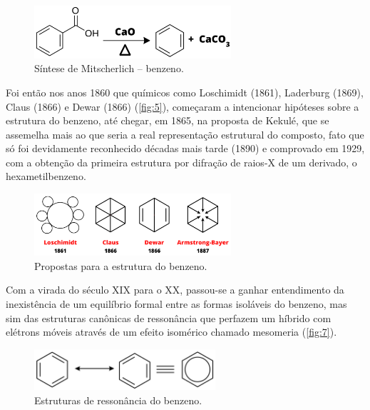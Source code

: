 \begin{figure}[htb]
	\caption{Síntese de Mitscherlich – benzeno.}
    \label{fig:4a}
	\begin{center}
		\includegraphics[width=0.65\textwidth]{images/fig2(2).png}
	\end{center}
\end{figure}

Foi então nos anos 1860 que químicos como Loschimidt (1861), Laderburg (1869), Claus (1866) e Dewar (1866) (\autoref{fig:5}), começaram a intencionar hipóteses sobre a estrutura do benzeno, até chegar, em 1865, na proposta de Kekulé, que se assemelha mais ao que seria a real representação estrutural do composto, fato que só foi devidamente reconhecido décadas mais tarde (1890) e comprovado em 1929\autocite{Lonsdale1929}, com a obtenção da primeira estrutura por difração de raios-X de um derivado, o hexametilbenzeno.

\begin{figure}[htb]
	\caption{Propostas para a estrutura do benzeno.}
    \label{fig:5}
	\begin{center}
		\includegraphics[width=0.65\textwidth]{images/8(1).png}
	\end{center}
\end{figure}

Com a virada do século XIX para o XX, passou-se a ganhar entendimento da inexistência de
um equilíbrio formal entre as formas isoláveis do benzeno, mas sim das estruturas canônicas de ressonância que perfazem um híbrido com elétrons móveis através de um efeito isomérico chamado mesomeria \autocite{Murrell1956, INGOLD1934, Oudar1975} (\autoref{fig:7}). 

\begin{figure}[htb]
	\caption{Estruturas de ressonância do benzeno.}
    \label{fig:7}
	\begin{center}
		\includegraphics[width=0.6\textwidth]{images/7.png}
	\end{center}
\end{figure}

